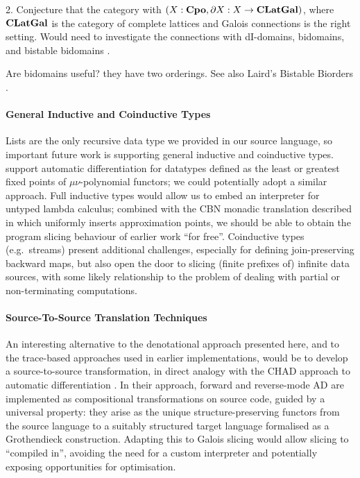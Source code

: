 2. Conjecture that the category with $(X : \mathbf{Cpo}, \partial X : X \to \mathbf{CLatGal})$, where $\mathbf{CLatGal}$ is the category of complete lattices and Galois connections is the right setting. Would need to investigate the connections with dI-domains, bidomains, and bistable bidomains \cite{laird07}.

Are bidomains \cite{berry79} useful? they have two orderings. See also
Laird's Bistable Biorders \cite{laird07}.

\paragraph{General Inductive and Coinductive Types}

Lists are the only recursive data type we provided in our source language, so important future work is
supporting general inductive and coinductive types. \citet{nunes2023} support automatic differentiation for
datatypes defined as the least or greatest fixed points of $\mu\nu$-polynomial functors; we could potentially
adopt a similar approach. Full inductive types would allow us to embed an interpreter for untyped lambda
calculus; combined with the CBN monadic translation described in  which uniformly inserts
approximation points, we should be able to obtain the program slicing behaviour of earlier \GPS work ``for
free''. Coinductive types (e.g.~streams) present additional challenges, especially for defining
join-preserving backward maps, but also open the door to slicing (finite prefixes of) infinite data sources,
with some likely relationship to the problem of dealing with partial or non-terminating computations.

\paragraph{Source-To-Source Translation Techniques}


An interesting alternative to the denotational approach presented here, and to the trace-based approaches used
in earlier \GPS implementations, would be to develop a source-to-source transformation, in direct analogy with
the CHAD approach to automatic differentiation \cite{vakar22,nunes2023}. In their approach, forward and
reverse-mode AD are implemented as compositional transformations on source code, guided by a universal
property: they arise as the unique structure-preserving functors from the source language to a suitably
structured target language formalised as a Grothendieck construction. Adapting this to Galois slicing would
allow slicing to ``compiled in'', avoiding the need for a custom interpreter and potentially exposing
opportunities for optimisation.
